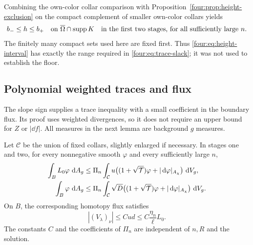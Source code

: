 Combining the own-color collar comparison with
Proposition~\ref{four:prop:height-exclusion} on the compact complement of
smaller own-color collars yields
\begin{equation}\label{four:eq:height-interval}
 b_-\le h\le b_+
 \quad\text{on }\overline\Omega\cap\operatorname{supp} K
 \quad\text{in the first two stages, for all sufficiently large }n.
\end{equation}
The finitely many compact sets used here are fixed first.  Thus
\eqref{four:eq:height-interval} has exactly the range required in
\eqref{four:eq:trace-slack}; it was not used to establish the floor.

\subsection{Polynomial weighted traces and flux}

The slope sign supplies a trace inequality with a small coefficient
in the boundary flux.  Its proof uses weighted divergences, so it
does not require an upper bound for $Z$ or $|\dd f|$.
All measures in the next lemma are background $g$ measures.

\begin{lemma}\label{four:lem:weighted-trace}
Let $\mathcal C$ be the union of fixed collars, slightly enlarged
if necessary.  In stages one and two, for every nonnegative smooth
$\varphi$ and every sufficiently large $n$,
\begin{align}
 \int_B L_0\varphi\,\,\mathrm d A_g
 &\le\Pi_n\int_{\mathcal C}u
       \bigl((1+\sqrt{\mathcal T})\varphi+|\,\mathrm d\varphi|_{A_\chi}\bigr)\,\,\mathrm d V_g,
       \label{four:bnd:weighted-trace}\\
 \int_B\varphi\,\,\mathrm d A_g
 &\le\Pi_n\int_{\mathcal C}\sqrt D
       \bigl((1+\sqrt{\mathcal T})\varphi+|\,\mathrm d\varphi|_{A_\chi}\bigr)\,\,\mathrm d V_g.
       \label{four:bnd:unweighted-trace}
\end{align}
On $B$, the corresponding homotopy flux satisfies
\begin{equation}\label{four:eq:boundary-flux-bound}
 |(V_\lambda)_\nu|\le Cud
 \le C\frac{\eta_n}{\ell}L_0.
\end{equation}
The constants $C$ and the coefficients of $\Pi_n$ are independent
of $n,R$ and the solution.
\end{lemma}


